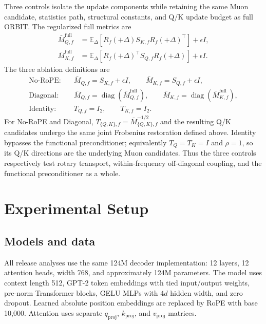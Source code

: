Three controls isolate the update components while retaining the same Muon candidate,
statistics path, structural constants, and Q/K update budget as full ORBIT. The regularized
full metrics are
\begin{equation}
\begin{aligned}
\bar M^{\mathrm{full}}_{Q,f}
&=\mathbb{E}_{\Delta}\!\left[
R_f(+\Delta)S_{K,f}R_f(+\Delta)^\top\right]+\epsilon I,\\
\bar M^{\mathrm{full}}_{K,f}
&=\mathbb{E}_{\Delta}\!\left[
R_f(+\Delta)^\top S_{Q,f}R_f(+\Delta)\right]+\epsilon I.
\end{aligned}
\label{eq:ablation-full-metrics}
\end{equation}
The three ablation definitions are
\begin{equation}
\begin{aligned}
\text{No-RoPE:}\quad
&\bar M_{Q,f}=S_{K,f}+\epsilon I,
\qquad
\bar M_{K,f}=S_{Q,f}+\epsilon I,\\[0.25em]
\text{Diagonal:}\quad
&\bar M_{Q,f}=\operatorname{diag}\!\left(\bar M^{\mathrm{full}}_{Q,f}\right),
\qquad
\bar M_{K,f}=\operatorname{diag}\!\left(\bar M^{\mathrm{full}}_{K,f}\right),\\[0.25em]
\text{Identity:}\quad
&T_{Q,f}=I_2,
\qquad
T_{K,f}=I_2.
\end{aligned}
\label{eq:ablation-definitions}
\end{equation}
For No-RoPE and Diagonal,
$T_{\{Q,K\},f}=\bar M_{\{Q,K\},f}^{-1/2}$ and the resulting Q/K candidates undergo the
same joint Frobenius restoration defined above. Identity bypasses the functional
preconditioner; equivalently $T_Q=T_K=I$ and $\rho=1$, so its Q/K directions are the
underlying Muon candidates. Thus the three controls respectively test rotary transport,
within-frequency off-diagonal coupling, and the functional preconditioner as a whole.

\section{Experimental Setup}
\subsection{Models and data}
All release analyses use the same 124M decoder implementation: 12 layers, 12 attention
heads, width 768, and approximately 124M parameters. The model uses context length 512,
GPT-2 token embeddings with tied input/output weights, pre-norm Transformer blocks, GELU
MLPs with $4d$ hidden width, and zero dropout. Learned absolute position embeddings are
replaced by RoPE with base 10,000. Attention uses separate $q_{\mathrm{proj}}$,
$k_{\mathrm{proj}}$, and $v_{\mathrm{proj}}$ matrices.

